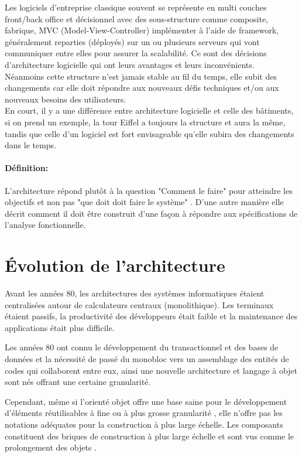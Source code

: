 \documentclass[12pt, a4paper, openany]{report}
\begin{document}
 Les logiciels d’entreprise classique souvent se représente en multi couches front/back office et décisionnel avec des sous-structure comme composite, fabrique, MVC (Model-View-Controller) implémenter à l’aide de framework, généralement reparties (déployés) sur un ou plusieurs serveurs qui vont communiquer entre elles pour assurer la scalabilité. Ce sont des décisions d’architecture logicielle qui ont leurs avantages et leurs inconvénients.\\
 
 Néanmoins cette structure n’est jamais stable au fil du temps, elle subit des changements car elle doit répondre aux nouveaux défis techniques et/ou aux nouveaux besoins des utilisateurs.\\
  
 En court, il y a une différence entre architecture logicielle et celle des bâtiments, si on prend un exemple, la tour Eiffel a toujours la structure et aura la même, tandis que celle d’un logiciel est fort envisageable qu’elle subira des changements dans le temps.
 
 \paragraph{Définition:}
 L’architecture répond plutôt à la question "Comment le faire" \cite{refbibArch} pour atteindre les objectifs et non pas "que doit doit faire le système" \cite{refbibArch} . D’une autre manière elle décrit comment il doit être construit d’une façon à répondre aux spécifications de l’analyse fonctionnelle.
 
 \section{Évolution de l'architecture}
  Avant les années 80, les architectures des systèmes informatiques étaient centralisées autour de calculateurs centraux (monolithique). Les terminaux étaient passifs, la productivité des développeurs était faible et la maintenance des applications était plus difficile.
  
  Les années 80 ont connu le développement du transactionnel et des bases de données et la nécessité de passé du monobloc vers un assemblage des entités de codes qui collaborent entre eux, ainsi une nouvelle architecture et langage à objet sont nés offrant une certaine granularité.
  
  Cependant, même si l’orienté objet offre une base saine pour le développement d’éléments réutilisables à fine ou à plus grosse granularité \cite{refbib1} , elle n’offre pas les notations adéquates pour la construction à plus large échelle. Les composants constituent des briques de construction à plus large échelle et sont vus comme le prolongement des objets \cite{refbib2}.
  
\end{document}
